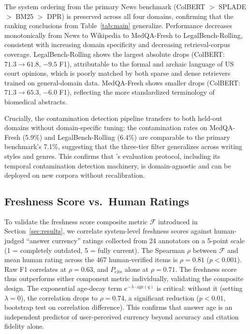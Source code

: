 The system ordering from the primary News benchmark (ColBERT $>$ SPLADE $>$ BM25 $>$ DPR) is preserved across all four domains, confirming that the ranking conclusions from Table~\ref{tab:main} generalize. Performance decreases monotonically from News to Wikipedia to MedQA-Fresh to LegalBench-Rolling, consistent with increasing domain specificity and decreasing retrieval-corpus coverage. LegalBench-Rolling shows the largest absolute drops (ColBERT: $71.3 \to 61.8$, $-9.5$ F1), attributable to the formal and archaic language of US court opinions, which is poorly matched by both sparse and dense retrievers trained on general-domain data. MedQA-Fresh shows smaller drops (ColBERT: $71.3 \to 65.3$, $-6.0$ F1), reflecting the more standardized terminology of biomedical abstracts.

Crucially, the \method{} contamination detection pipeline transfers to both held-out domains without domain-specific tuning: the contamination rates on MedQA-Fresh (5.9\%) and LegalBench-Rolling (6.4\%) are comparable to the primary benchmark's 7.1\%, suggesting that the three-tier filter generalizes across writing styles and genres. This confirms that \method{}'s evaluation protocol, including its temporal contamination detection machinery, is domain-agnostic and can be deployed on new corpora without recalibration.

\subsection{Freshness Score vs.\ Human Ratings}

To validate the freshness score composite metric $\mathcal{F}$ introduced in Section~\ref{sec:results}, we correlate system-level freshness scores against human-judged ``answer currency'' ratings collected from 24 annotators on a 5-point scale (1 = completely outdated, 5 = fully current). The Spearman $\rho$ between $\mathcal{F}$ and mean human rating across the 467 human-verified items is $\rho = 0.81$ ($p < 0.001$). Raw F1 correlates at $\rho = 0.63$, and $P_{\text{cite}}$ alone at $\rho = 0.71$. The freshness score thus outperforms either component metric individually, validating the composite design. The exponential age-decay term $e^{-\lambda \cdot \text{age}(q)}$ is critical: without it (setting $\lambda = 0$), the correlation drops to $\rho = 0.74$, a significant reduction ($p < 0.01$, bootstrap test on correlation difference). This confirms that answer age is an independent predictor of user-perceived currency beyond accuracy and citation fidelity alone.

